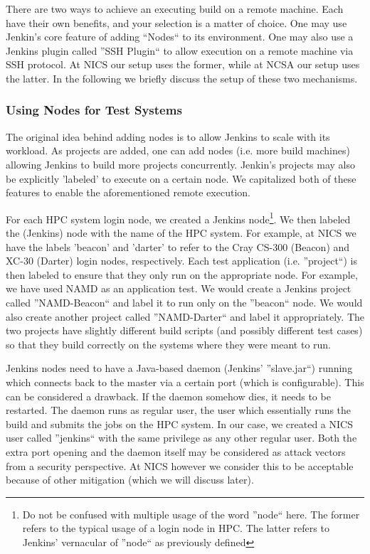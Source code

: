 \documentclass[10pt, conference, compsocconf]{IEEEtran}
\begin{document}
There are two ways to achieve an executing build on a remote machine. 
Each have their own benefits, and your selection is a matter of choice. 
One may use Jenkin's core feature of adding ``Nodes`` to its environment. 
One may also use a Jenkins plugin called ''SSH Plugin`` to allow execution on a remote machine via SSH protocol. 
At NICS our setup uses the former, while at NCSA our setup uses the latter. 
In the following we briefly discuss the setup of these two mechanisms.

\subsubsection{Using Nodes for Test Systems}
The original idea behind adding nodes is to allow Jenkins to scale with its workload. 
As projects are added, one can add nodes (i.e. more build machines) allowing Jenkins to build more projects concurrently. 
Jenkin's projects may also be explicitly 'labeled' to execute on a certain node. 
We capitalized both of these features to enable the aforementioned remote execution.

For each HPC system login node, we created a Jenkins node\footnote{Do not be confused with multiple usage of the word ''node`` here. 
The former refers to the typical usage of a login node in HPC. 
The latter refers to Jenkins' vernacular of ''node`` as previously defined}. 
We then labeled the (Jenkins) node with the name of the HPC system. 
For example, at NICS we have the labels 'beacon' and 'darter' to refer to the Cray CS-300 (Beacon) and XC-30 (Darter) login nodes, respectively. 
Each test application (i.e. ''project``) is then labeled to ensure that they only run on the appropriate node. 
For example, we have used NAMD \cite{namd} as an application test. 
We would create a Jenkins project called ''NAMD-Beacon`` and label it to run only on the ''beacon`` node. 
We would also create another project called ''NAMD-Darter`` and label it appropriately. 
The two projects have slightly different build scripts (and possibly different test cases) so that they build correctly on the systems where they were meant to run.

Jenkins nodes need to have a Java-based daemon (Jenkins' ''slave.jar``) running which connects back to the master via a certain port (which is configurable). 
This can be considered a drawback. 
If the daemon somehow dies, it needs to be restarted. 
The daemon runs as regular user, the user which essentially runs the build and submits the jobs on the HPC system. 
In our case, we created a NICS user called ''jenkins`` with the same privilege as any other regular user. 
Both the extra port opening and the daemon itself may be considered as attack vectors from a security perspective. 
At NICS however we consider this to be acceptable because of other mitigation (which we will discuss later).
\end{document}
